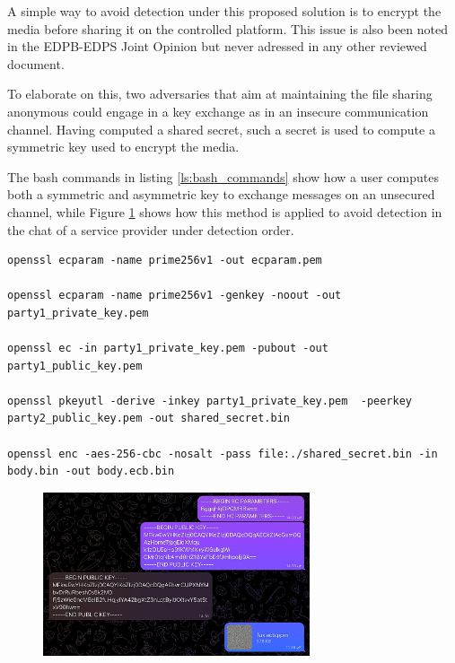 A simple way to avoid detection under this proposed solution is to encrypt the media before sharing it on the controlled platform. This issue is also been noted in the EDPB-EDPS Joint Opinion \cite{Joint} but never adressed in any other reviewed document.

To elaborate on this, two adversaries that aim at maintaining the file sharing anonymous could engage in a key exchange as in an insecure communication channel. Having computed a shared secret, such a secret is used to compute a symmetric key used to encrypt the media.

The bash commands in listing \ref{ls:bash_commands} show how a user computes both a symmetric and asymmetric key to exchange messages on an unsecured channel, while Figure \ref{fig:chat} shows how this method is applied to avoid detection in the chat of a service provider under detection order.
\\


\begin{lstlisting}
openssl ecparam -name prime256v1 -out ecparam.pem

openssl ecparam -name prime256v1 -genkey -noout -out party1_private_key.pem

openssl ec -in party1_private_key.pem -pubout -out party1_public_key.pem

openssl pkeyutl -derive -inkey party1_private_key.pem  -peerkey party2_public_key.pem -out shared_secret.bin

openssl enc -aes-256-cbc -nosalt -pass file:./shared_secret.bin -in body.bin -out body.ecb.bin
\end{lstlisting}
\label{ls:bash_commands}

\begin{figure}
    \centering
    \includegraphics[keepaspectratio,width=0.7\textwidth]{05-results/img/enc_chat.jpg}
    \label{fig:chat}
\end{figure}

